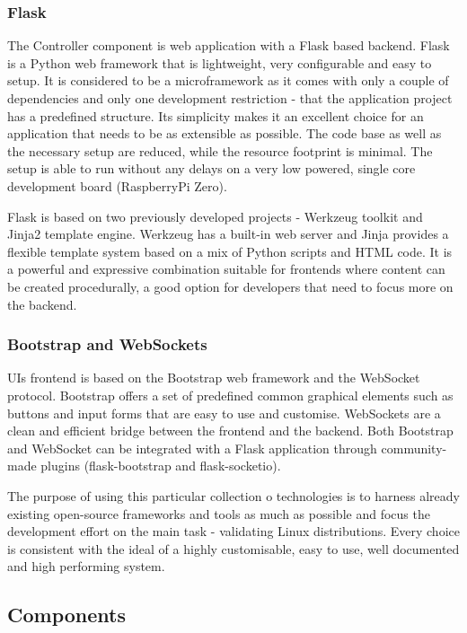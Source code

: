 \subsubsection*{Flask}
The Controller component is web application with a Flask based backend. Flask is a Python web framework that is lightweight, very configurable and easy to setup. It is considered to be a microframework as it comes with only a couple of dependencies and only one development restriction - that the application project has a predefined structure. Its simplicity makes it an excellent choice for an application that needs to be as extensible as possible. The code base as well as the necessary setup are reduced, while the resource footprint is minimal. The setup is able to run without any delays on a very low powered, single core development board (RaspberryPi Zero).

Flask is based on two previously developed projects - Werkzeug toolkit and Jinja2 template engine. Werkzeug has a built-in web server and Jinja provides a flexible template system based on a mix of Python scripts and HTML code. It is a powerful and expressive combination suitable for frontends where content can be created procedurally, a good option for developers that need to focus more on the backend.

\subsubsection*{Bootstrap and WebSockets}
UIs frontend is based on the Bootstrap web framework and the WebSocket protocol. Bootstrap offers a set of predefined common graphical elements such as buttons and input forms that are easy to use and customise. WebSockets are a clean and efficient bridge between the frontend and the backend. Both Bootstrap and WebSocket can be integrated with a Flask application through community-made plugins (flask-bootstrap and flask-socketio).

\vspace{7mm}

The purpose of using this particular collection o technologies is to harness already existing open-source frameworks and tools as much as possible and focus the development effort on the main task - validating Linux distributions. Every choice is consistent with the ideal of a highly customisable, easy to use, well documented and high performing system.

\subsection{Components}

